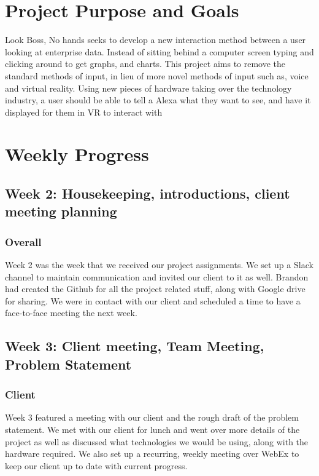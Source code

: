 \documentclass[onecolumn, draftclsnofoot,10pt, compsoc]{IEEEtran}
\begin{document}
\begin{titlepage}
\begin{singlespace}
\begin{abstract}
        \end{abstract}
    \end{singlespace}
\end{titlepage}
\newpage
{}
\tableofcontents
\clearpage

\section{Project Purpose and Goals}
    Look Boss, No hands seeks to develop a new interaction method between a user looking at enterprise data. Instead of sitting behind a computer screen typing and clicking around to get graphs, and charts. This project aims to remove the standard methods of input, in lieu of more novel methods of input such as, voice and virtual reality. Using new pieces of hardware taking over the technology industry, a user should be able to tell a Alexa what they want to see, and have it displayed for them in VR to interact with

\section{Weekly Progress}
    \subsection{Week 2: Housekeeping, introductions, client meeting planning}
    
        \subsubsection{Overall}
            Week 2 was the week that we received our project assignments. We set up a Slack channel to maintain communication and invited our client to it as well. Brandon had created the Github for all the project related stuff, along with Google drive for sharing. We were in contact with our client and scheduled a time to have a face-to-face meeting the next week.
    
    \subsection{Week 3: Client meeting, Team Meeting, Problem Statement}
    
        \subsubsection{Client}
            Week 3 featured a meeting with our client and the rough draft of the problem statement. We met with our client for lunch and went over more details of the project as well as discussed what technologies we would be using, along with the hardware required. We also set up a recurring, weekly meeting over WebEx to keep our client up to date with current progress.
            
\end{document}
